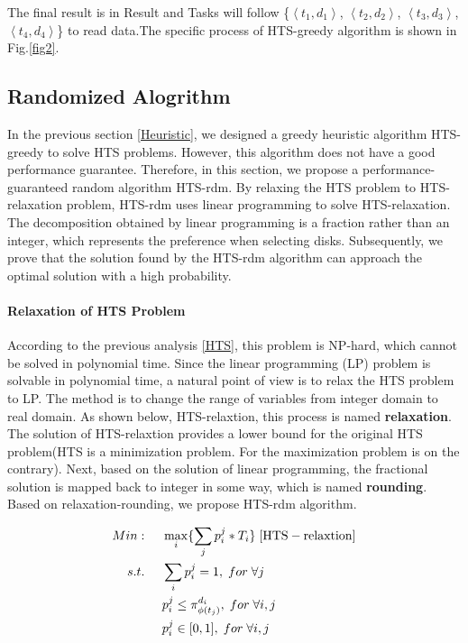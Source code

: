 \documentclass[conference]{IEEEtran}
\begin{document}
The final result is in Result and  Tasks will follow \{$\left \langle t_1, d_{1}\right \rangle$, $\left \langle t_2, d_{2}\right \rangle$,  $\left \langle t_3, d_{3}\right \rangle$, $\left \langle t_4, d_{4}\right \rangle$\} to read data.The specific process of HTS-greedy algorithm is shown in Fig.\ref{fig2}.

\subsection{Randomized Alogrithm}\label{Randomized}

In the previous section \ref{Heuristic}, we designed a greedy heuristic algorithm HTS-greedy to solve HTS problems. However, this algorithm does not have a good performance guarantee. Therefore, in this section, we propose a performance-guaranteed random algorithm HTS-rdm. By relaxing the HTS problem to HTS-relaxation problem, HTS-rdm uses linear programming to solve HTS-relaxation. The decomposition obtained by linear programming is a fraction rather than an integer, which represents the preference when selecting disks. Subsequently, we prove that the solution found by the HTS-rdm algorithm can approach the optimal solution with a high probability.

\paragraph{\textbf{Relaxation of HTS Problem}} According to the previous analysis \ref{HTS}, this problem is NP-hard, which cannot be solved in polynomial time. Since the linear programming (LP) problem is solvable in polynomial time, a natural point of view is to relax the HTS problem to LP. The method is to change the range of variables from integer domain to real domain. As shown below, HTS-relaxtion, this process is named \textbf{relaxation}. The solution of HTS-relaxtion provides a lower bound for the original HTS problem(HTS is a minimization problem. For the maximization problem is on the contrary). Next, based on the solution of linear programming, the fractional solution is mapped back to integer in some way, which is named \textbf{rounding}. Based on relaxation-rounding, we propose HTS-rdm algorithm.

 \begin{align}
 Min:&\;\;\;\;\;\max\limits_{i}\{\sum_{j}p_i^j*T_i\}\;[\rm{HTS-relaxtion}]\nonumber\\
 s.t. 
 &\;\;\;\;\;\sum_{i}p_i^j = 1,\;for\;\forall j\nonumber\\
 &\;\;\;\;\;p_i^j \leq \pi_{\phi(t_j)}^{d_i},\;for\;\forall i,j\nonumber\\
 &\;\;\;\;\;p_i^j \in[0, 1],\;for\;\forall i,j\nonumber
 \end{align}
 
\end{document}
